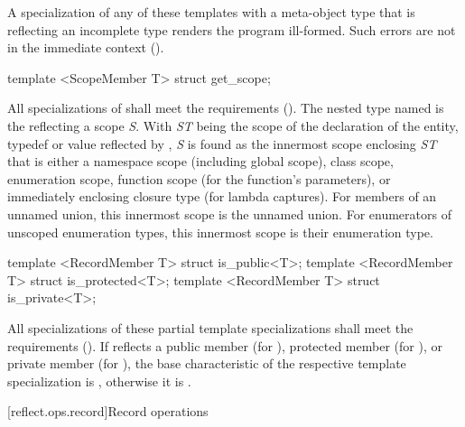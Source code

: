 \begin{std.txt}\color{addclr}
\pnum
A specialization of any of these templates with a meta-object type that is
reflecting an incomplete type renders the program ill-formed.  Such errors are
not in the immediate context ().


\begin{itemdecl}
template <ScopeMember T> struct get_scope;
\end{itemdecl}

\begin{itemdescr}
\pnum
All specializations of  shall meet the  requirements (). The nested type named  is the  reflecting a scope \emph{S}. With \emph{ST} being the scope of the declaration of the entity, typedef or value reflected by , \emph{S} is found as the innermost scope enclosing \emph{ST} that is either a namespace scope (including global scope), class scope, enumeration scope, function scope (for the function's parameters), or immediately enclosing closure type (for lambda captures). For members of an unnamed union, this innermost scope is the unnamed union. For enumerators of unscoped enumeration types, this innermost scope is their enumeration type.
\end{itemdescr}

\begin{itemdecl}
template <RecordMember T> struct is_public<T>;
template <RecordMember T> struct is_protected<T>;
template <RecordMember T> struct is_private<T>;
\end{itemdecl}

\begin{itemdescr}
\pnum
All specializations of these partial template specializations shall meet the  requirements (). If  reflects a public member (for ), protected member (for ), or private member (for ), the base characteristic of the respective template specialization is , otherwise it is .
\end{itemdescr}

\end{std.txt}

[reflect.ops.record]{Record operations}

